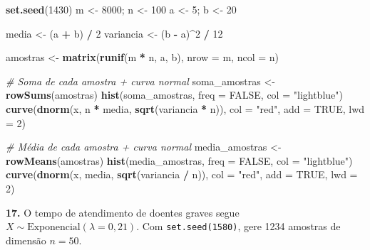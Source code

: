 \documentclass[
  portuguese,
  11pt,
  openany]{book}
\newenvironment{Shaded}{\begin{snugshade}}{\end{snugshade}}
\newcommand{\AttributeTok}[1]{\textcolor[rgb]{0.13,0.29,0.53}{#1}}
\newcommand{\CommentTok}[1]{\textcolor[rgb]{0.56,0.35,0.01}{\textit{#1}}}
\newcommand{\ConstantTok}[1]{\textcolor[rgb]{0.56,0.35,0.01}{#1}}
\newcommand{\DecValTok}[1]{\textcolor[rgb]{0.00,0.00,0.81}{#1}}
\newcommand{\FunctionTok}[1]{\textcolor[rgb]{0.13,0.29,0.53}{\textbf{#1}}}
\newcommand{\NormalTok}[1]{#1}
\newcommand{\OtherTok}[1]{\textcolor[rgb]{0.56,0.35,0.01}{#1}}
\newcommand{\SpecialCharTok}[1]{\textcolor[rgb]{0.81,0.36,0.00}{\textbf{#1}}}
\newcommand{\StringTok}[1]{\textcolor[rgb]{0.31,0.60,0.02}{#1}}
\begin{document}
\begin{Shaded}
\begin{Highlighting}[]
\FunctionTok{set.seed}\NormalTok{(}\DecValTok{1430}\NormalTok{)}
\NormalTok{m }\OtherTok{\textless{}{-}} \DecValTok{8000}\NormalTok{; n }\OtherTok{\textless{}{-}} \DecValTok{100}
\NormalTok{a }\OtherTok{\textless{}{-}} \DecValTok{5}\NormalTok{; b }\OtherTok{\textless{}{-}} \DecValTok{20}

\NormalTok{media }\OtherTok{\textless{}{-}}\NormalTok{ (a }\SpecialCharTok{+}\NormalTok{ b) }\SpecialCharTok{/} \DecValTok{2}
\NormalTok{variancia }\OtherTok{\textless{}{-}}\NormalTok{ (b }\SpecialCharTok{{-}}\NormalTok{ a)}\SpecialCharTok{\^{}}\DecValTok{2} \SpecialCharTok{/} \DecValTok{12}

\NormalTok{amostras }\OtherTok{\textless{}{-}} \FunctionTok{matrix}\NormalTok{(}\FunctionTok{runif}\NormalTok{(m }\SpecialCharTok{*}\NormalTok{ n, a, b), }\AttributeTok{nrow =}\NormalTok{ m, }\AttributeTok{ncol =}\NormalTok{ n)}

\CommentTok{\# Soma de cada amostra + curva normal}
\NormalTok{soma\_amostras }\OtherTok{\textless{}{-}} \FunctionTok{rowSums}\NormalTok{(amostras)}
\FunctionTok{hist}\NormalTok{(soma\_amostras, }\AttributeTok{freq =} \ConstantTok{FALSE}\NormalTok{, }\AttributeTok{col =} \StringTok{"lightblue"}\NormalTok{)}
\FunctionTok{curve}\NormalTok{(}\FunctionTok{dnorm}\NormalTok{(x, n }\SpecialCharTok{*}\NormalTok{ media, }\FunctionTok{sqrt}\NormalTok{(variancia }\SpecialCharTok{*}\NormalTok{ n)), }\AttributeTok{col =} \StringTok{"red"}\NormalTok{, }\AttributeTok{add =} \ConstantTok{TRUE}\NormalTok{, }\AttributeTok{lwd =} \DecValTok{2}\NormalTok{)}

\CommentTok{\# Média de cada amostra + curva normal}
\NormalTok{media\_amostras }\OtherTok{\textless{}{-}} \FunctionTok{rowMeans}\NormalTok{(amostras)}
\FunctionTok{hist}\NormalTok{(media\_amostras, }\AttributeTok{freq =} \ConstantTok{FALSE}\NormalTok{, }\AttributeTok{col =} \StringTok{"lightblue"}\NormalTok{)}
\FunctionTok{curve}\NormalTok{(}\FunctionTok{dnorm}\NormalTok{(x, media, }\FunctionTok{sqrt}\NormalTok{(variancia }\SpecialCharTok{/}\NormalTok{ n)), }\AttributeTok{col =} \StringTok{"red"}\NormalTok{, }\AttributeTok{add =} \ConstantTok{TRUE}\NormalTok{, }\AttributeTok{lwd =} \DecValTok{2}\NormalTok{)}
\end{Highlighting}
\end{Shaded}

\textbf{17.} O tempo de atendimento de doentes graves segue
\(X \sim \text{Exponencial}(\lambda = 0{,}21)\). Com \texttt{set.seed(1580)}, gere 1234 amostras
de dimensão \(n = 50\).
\end{document}

